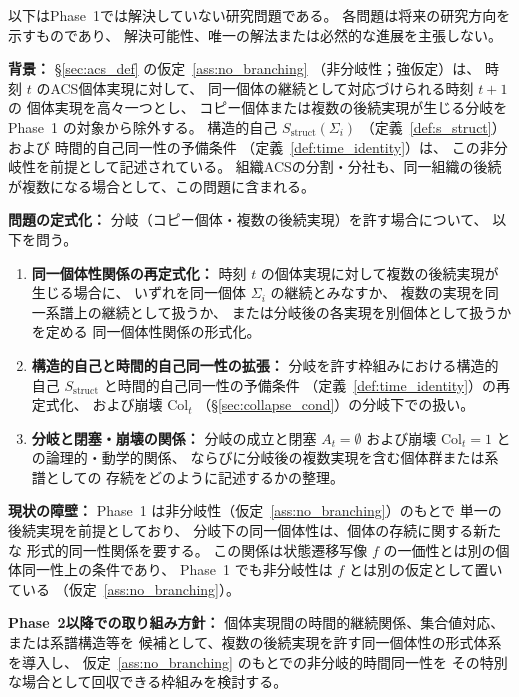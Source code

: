 以下はPhase~1では解決していない研究問題である。
各問題は将来の研究方向を示すものであり、
解決可能性、唯一の解法または必然的な進展を主張しない。

\begin{problem}[分岐を許す場合の同一個体性の再定式化]
\label{prob:branching_identity}

\textbf{背景：}
\S\ref{sec:acs_def} の仮定~\ref{ass:no_branching}
（非分岐性；強仮定）は、
時刻 $t$ のACS個体実現に対して、
同一個体の継続として対応づけられる時刻 $t+1$ の
個体実現を高々一つとし、
コピー個体または複数の後続実現が生じる分岐を
Phase~1 の対象から除外する。
構造的自己 $S_{\mathrm{struct}}(\Sigma_i)$
（定義~\ref{def:s_struct}）および
時間的自己同一性の予備条件
（定義~\ref{def:time_identity}）は、
この非分岐性を前提として記述されている。
組織ACSの分割・分社も、同一組織の後続が複数になる場合として、この問題に含まれる。

\textbf{問題の定式化：}
分岐（コピー個体・複数の後続実現）を許す場合について、
以下を問う。

\begin{enumerate}
  \item[(i)] \textbf{同一個体性関係の再定式化：}
  時刻 $t$ の個体実現に対して複数の後続実現が生じる場合に、
  いずれを同一個体 $\Sigma_i$ の継続とみなすか、
  複数の実現を同一系譜上の継続として扱うか、
  または分岐後の各実現を別個体として扱うかを定める
  同一個体性関係の形式化。

  \item[(ii)] \textbf{構造的自己と時間的自己同一性の拡張：}
  分岐を許す枠組みにおける構造的自己
  $S_{\mathrm{struct}}$ と時間的自己同一性の予備条件
  （定義~\ref{def:time_identity}）の再定式化、
  および崩壊 $\mathrm{Col}_t$
  （\S\ref{sec:collapse_cond}）の分岐下での扱い。

  \item[(iii)] \textbf{分岐と閉塞・崩壊の関係：}
  分岐の成立と閉塞
  $A_t=\emptyset$ および崩壊
  $\mathrm{Col}_t=1$ との論理的・動学的関係、
  ならびに分岐後の複数実現を含む個体群または系譜としての
  存続をどのように記述するかの整理。
\end{enumerate}

\textbf{現状の障壁：}
Phase~1 は非分岐性（仮定~\ref{ass:no_branching}）のもとで
単一の後続実現を前提としており、
分岐下の同一個体性は、個体の存続に関する新たな
形式的同一性関係を要する。
この関係は状態遷移写像 $f$ の一価性とは別の個体同一性上の条件であり、
Phase~1 でも非分岐性は $f$ とは別の仮定として置いている
（仮定~\ref{ass:no_branching}）。

\textbf{Phase~2以降での取り組み方針：}
個体実現間の時間的継続関係、集合値対応、または系譜構造等を
候補として、複数の後続実現を許す同一個体性の形式体系を導入し、
仮定~\ref{ass:no_branching} のもとでの非分岐的時間同一性を
その特別な場合として回収できる枠組みを検討する。
\end{problem}


